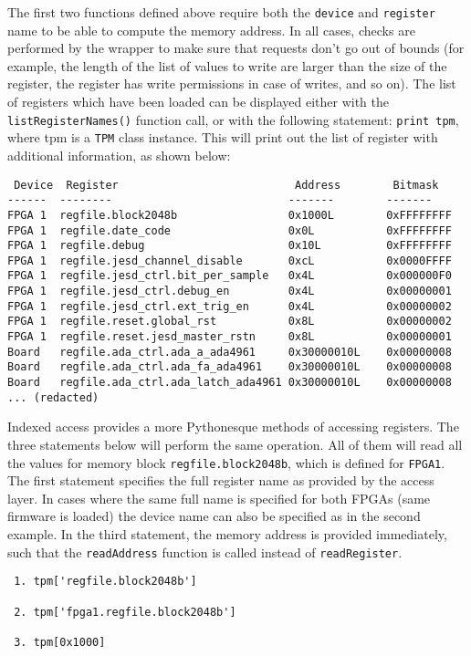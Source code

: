 \documentclass[a4paper,11pt]{article}
\begin{document}
The first two functions defined above require both the \texttt{device} and 
\texttt{register} name to be able to compute the memory address. In all cases, 
checks are performed by the wrapper to make sure that requests don't go out of 
bounds (for example, the length of the list of values to write are larger than 
the size of the register, the register has write permissions in case of writes, 
and so on). The list of registers which have been loaded can be displayed 
either 
with the \texttt{listRegisterNames()} function call, or with the following 
statement: \texttt{print tpm}, where tpm is a \texttt{TPM} class instance. This 
will print out the list of register with additional information, as shown below:

\begin{lstlisting}
 Device  Register                           Address        Bitmask
------  --------                           -------        -------
FPGA 1	regfile.block2048b                 0x1000L        0xFFFFFFFF
FPGA 1	regfile.date_code                  0x0L           0xFFFFFFFF
FPGA 1	regfile.debug                      0x10L          0xFFFFFFFF
FPGA 1	regfile.jesd_channel_disable       0xcL           0x0000FFFF
FPGA 1	regfile.jesd_ctrl.bit_per_sample   0x4L           0x000000F0
FPGA 1	regfile.jesd_ctrl.debug_en         0x4L           0x00000001
FPGA 1	regfile.jesd_ctrl.ext_trig_en      0x4L           0x00000002
FPGA 1	regfile.reset.global_rst           0x8L           0x00000002
FPGA 1	regfile.reset.jesd_master_rstn     0x8L           0x00000001
Board   regfile.ada_ctrl.ada_a_ada4961     0x30000010L    0x00000008
Board   regfile.ada_ctrl.ada_fa_ada4961    0x30000010L    0x00000008
Board   regfile.ada_ctrl.ada_latch_ada4961 0x30000010L    0x00000008
... (redacted)
\end{lstlisting}

Indexed access provides a more Pythonesque methods of accessing registers. The 
three statements below will perform the same operation. All of them will read 
all the values for memory block \texttt{regfile.block2048b}, which is defined 
for \texttt{FPGA1}. The first statement specifies the full register name as 
provided by the access layer. In cases where the same full name is specified 
for both FPGAs (same firmware is loaded) the device name can also be specified 
as in the second example. In the third statement, the memory address is 
provided immediately, such that the \texttt{readAddress} function is called 
instead of \texttt{readRegister}.

\begin{lstlisting} 
 1. tpm['regfile.block2048b']
 
 2. tpm['fpga1.regfile.block2048b']
 
 3. tpm[0x1000]
\end{lstlisting}
\end{document}
